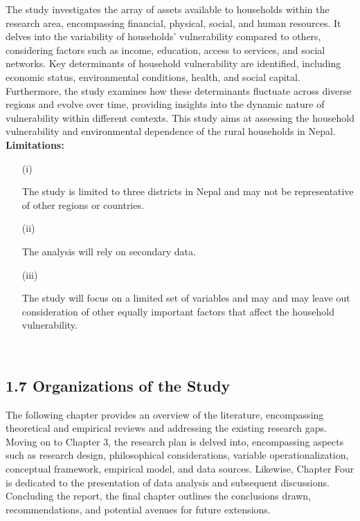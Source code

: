The study investigates the array of assets available to households within the research area, encompassing financial, physical, social, and human resources. It delves into the variability of households' vulnerability compared to others, considering factors such as income, education, access to services, and social networks. Key determinants of household vulnerability are identified, including economic status, environmental conditions, health, and social capital. Furthermore, the study examines how these determinants fluctuate across diverse regions and evolve over time, providing insights into the dynamic nature of vulnerability within different contexts.
This study aims at assessing the household vulnerability and environmental dependence of the rural households in Nepal.\\
\newline
\textbf{Limitations:}
\begin{enumerate}
	\item[(i)] \parbox[t]{\linewidth}{The study is limited to three districts in Nepal and may not be representative of 
		other regions or countries.}
	\item[(ii)] \parbox[t]{\linewidth}{The analysis will rely on secondary data.}
	\item[(iii)] \parbox[t]{\linewidth}{The study will focus on a limited set of variables and may  and may leave out consideration of other equally important factors that affect the household vulnerability.}\\
\end{enumerate}

\subsection*{1.7 Organizations of the Study}
\renewcommand{\thepage}{\arabic{page}}
The following chapter provides an overview of the literature, encompassing
theoretical and empirical reviews and addressing the existing research gaps. Moving on to Chapter 3, the research plan is delved into, encompassing aspects such as research design, philosophical considerations, variable operationalization, conceptual framework, empirical model, and data sources. Likewise, Chapter Four is dedicated to the presentation of data analysis and subsequent discussions. Concluding
the report, the final chapter outlines the conclusions drawn, recommendations, and
potential avenues for future extensions.


